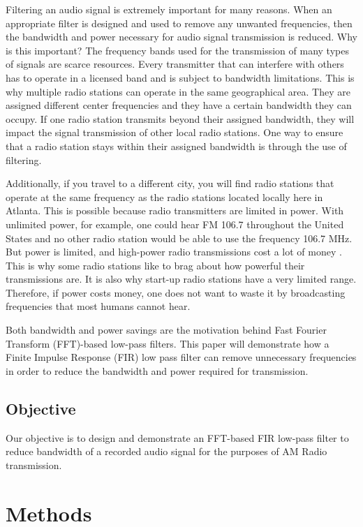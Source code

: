 Filtering an audio signal is extremely important for many
reasons. When an appropriate filter is designed and used to
remove any unwanted frequencies, then the bandwidth and power
necessary for audio signal transmission is reduced. Why is this
important? The frequency bands used for the transmission of many
types of signals are scarce resources. Every transmitter that can
interfere with others has to operate in a licensed band and is
subject to bandwidth limitations. This is why multiple radio
stations can operate in the same geographical area. They are
assigned different center frequencies and they have a certain
bandwidth they can occupy. If one radio station transmits beyond
their assigned bandwidth, they will impact the signal
transmission of other local radio stations. One way to ensure
that a radio station stays within their assigned bandwidth is
through the use of filtering.\cite{notes:class}  

Additionally, if you travel to a different city, you will find
radio stations that operate at the same frequency as the radio
stations located locally here in Atlanta. This is possible
because radio transmitters are limited in power. With unlimited
power, for example, one could hear FM 106.7 throughout the United
States and no other radio station would be able to use the
frequency 106.7 MHz. But power is limited, and high-power radio
transmissions cost a lot of money \cite{notes:class}. This is why
some radio stations like to brag about how powerful their
transmissions are. It is also why start-up radio stations have a
very limited range. Therefore, if power costs money, one does not
want to waste it by broadcasting frequencies that most humans
cannot hear.

Both bandwidth and power savings are the motivation behind Fast
Fourier Transform (FFT)-based low-pass filters. This paper will
demonstrate how a Finite Impulse Response (FIR) low pass filter
can remove unnecessary frequencies in order to reduce the
bandwidth and power required for transmission.  

\subsection{Objective}

Our objective is to design and demonstrate an FFT-based FIR
low-pass filter to reduce bandwidth of a recorded audio signal
for the purposes of AM Radio transmission.

\section{Methods}

